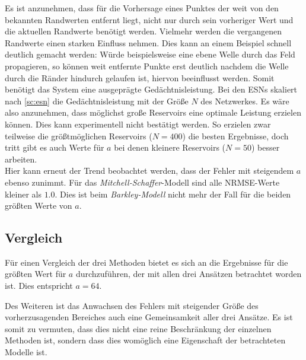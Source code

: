 Es ist anzunehmen, dass für die Vorhersage eines Punktes der weit von den bekannten Randwerten entfernt liegt, nicht nur durch sein vorheriger Wert und die aktuellen Randwerte benötigt werden. Vielmehr werden die vergangenen Randwerte einen starken Einfluss nehmen. Dies kann an einem Beispiel schnell deutlich gemacht werden: Würde beispielsweise eine ebene Welle durch das Feld propagieren, so können weit entfernte Punkte erst deutlich nachdem die Welle durch die Ränder hindurch gelaufen ist, hiervon beeinflusst werden. Somit benötigt das System eine ausgeprägte Gedächtnisleistung. Bei den \textsc{ESN}s skaliert nach \ref{sc:esn} die Gedächtnisleistung mit der Größe $N$ des Netzwerkes. Es wäre also anzunehmen, dass möglichst große Reservoirs eine optimale Leistung erzielen können. Dies kann experimentell nicht bestätigt werden. So erzielen zwar teilweise die größtmöglichen Reservoirs ($N=400$) die besten Ergebnisse, doch tritt gibt es auch Werte für $a$ bei denen kleinere Reservoirs ($N=50$) besser arbeiten.\\

Hier kann erneut der Trend beobachtet werden, dass der Fehler mit steigendem $a$ ebenso zunimmt. Für das \textit{Mitchell-Schaffer}-Modell sind alle NRMSE-Werte kleiner als $1.0$. Dies ist beim \textit{Barkley-Modell} nicht mehr der Fall für die beiden größten Werte von $a$. 

\subsection{Vergleich}
Für einen Vergleich der drei Methoden bietet es sich an die Ergebnisse für die größten Wert für $a$ durchzuführen, der mit allen drei Ansätzen betrachtet worden ist. Dies entspricht $a=64$. 


Des Weiteren ist das Anwachsen des Fehlers mit steigender Größe des vorherzusagenden Bereiches auch eine Gemeinsamkeit aller drei Ansätze. Es ist somit zu vermuten, dass dies nicht eine reine Beschränkung der einzelnen Methoden ist, sondern dass dies womöglich eine Eigenschaft der betrachteten Modelle ist. 
